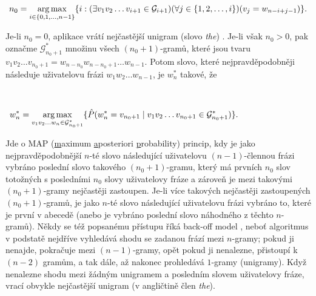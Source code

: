 \begin{equation*}
  n_{0} = \operatorname*{arg\,max}_{i \in \{ 0, 1, \ldots, n - 1 \}} \{i : 
  (\exists v_{1}v_{2} \ldots v_{i + 1} \in \mathcal{G}_{i + 1})
  (\forall j \in \{1, 2, \ldots, i\})(v_{j} = w_{n - i + j - 1}) \}.
\end{equation*}

Je-li $n_{0} = 0$, aplikace vrátí nejčastější unigram (slovo \textit{the})%
.
Je-li však $n_{0} > 0$, pak označme $\mathcal{G}_{n_{0} + 1}^{*}$ množinu
všech $(n_{0} + 1)$-gramů, které jsou tvaru $v_{1}v_{2} \ldots v_{n_{0} + 1} =
w_{n - n_{0}}w_{n - n_{0} + 1} \ldots w_{n - 1}$. Potom slovo, které
nejpravděpodobněji následuje uživatelovu frázi
$w_{1}w_{2} \ldots w_{n - 1}$, je $w_{n}^{*}$ takové, že

\vspace{-1.0cm}
\begin{align*}
  \phantom{n_{0}} &\phantom{= \argmax_{i \in \{ 0, 1, \ldots, n - 1 \}} \{i : 
  (\exists v_{1}v_{2} \ldots v_{i + 1} \in \mathcal{G}_{i + 1})
  (\forall j \in \{1, 2, \ldots, i\})(v_{j} = w_{n - i + j - 1}) \}.} \\
  w_{n}^{*} &= \argmax_{v_{1}v_{2} \ldots w_{n} \in \mathcal{G}_{n_{0}
  + 1}^{*}} \{
  \hat{P}(w_{n}^{*} = v_{n_{0} + 1} \mid v_{1}v_{2} \ldots v_{n_{0} + 1} \in 
  \mathcal{G}_{n_{0} + 1}^{*} ) \}.
\end{align*}

Jde o MAP (\underline{m}aximum \underline{a}posteriori \underline{p}robability)
princip, kdy je jako
nejpravděpodobnější $n$-té slovo následující uživatelovu
$(n - 1)$-člennou frázi vybráno poslední slovo
takového $(n_{0} + 1)$-gramu,
který má prvních $n_{0}$ slov totožných s posledními $n_{0}$ slovy uživatelovy
fráze a zároveň je mezi takovými $(n_{0} + 1)$-gramy nejčastěji zastoupen.
Je-li více takových nejčastěji zastoupených $(n_{0} + 1)$-gramů, je jako
$n$-té slovo následující uživatelovu frázi vybráno to, které je první
v abecedě (anebo je vybráno poslední slovo náhodného z těchto $n$-gramů).
Někdy se též popsanému přístupu říká back-off model%
, neboť algoritmus
v podstatě nejdříve vyhledává shodu se zadanou frází mezi $n$-gramy;
pokud
ji nenajde, pokračuje mezi $(n - 1)$-gramy, opět pokud ji nenalezne,
přistoupí k $(n - 2)$ gramům, a tak dále, až nakonec prohledává $1$-gramy
(unigramy). Když nenalezne shodu mezi žádným unigramem a posledním slovem
uživatelovy fráze, vrací obvykle nejčastější unigram (v angličtině člen
\textit{the}).

